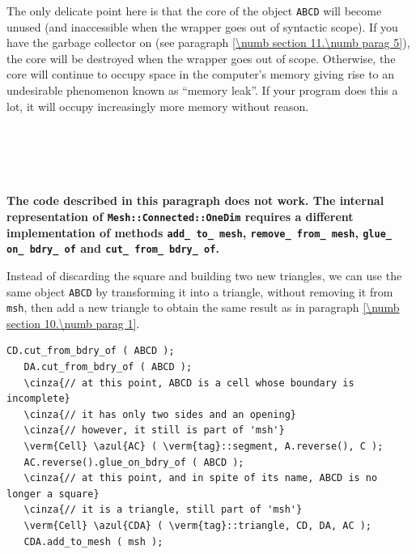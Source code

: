 The only delicate point here is that the core of the {\small\tt{}} object
{\small\tt ABCD}
will become unused (and inaccessible when the wrapper goes out of syntactic scope).
If you have the garbage collector on (see paragraph \ref{\numb section 11.\numb parag 5}),
the core will be destroyed when the wrapper goes out of scope.
Otherwise, the core will continue to occupy space in the computer's memory giving rise
to an undesirable phenomenon known as ``memory leak''.
If your program does this a lot, it will occupy increasingly more memory without reason.


\section{~~}\label{\numb section 10.\numb parag 2}

{\normalfont\bfseries The code described in this paragraph does not work.
The internal representation of {\small\tt Mesh::Connected::OneDim} requires a different
implementation of methods {\small\tt add\_\,to\_\,mesh}, {\small\tt remove\_\,from\_\,mesh},
{\small\tt glue\_\,on\_\,bdry\_\,of} and {\small\tt cut\_\,from\_\,bdry\_\,of}.              }

Instead of discarding the square and building two new triangles, we can use the same
{\small\tt{}} object {\small\tt ABCD}
by transforming it into a triangle, without removing it from {\small\tt msh}, then add
a new triangle to obtain the same result as in paragraph \ref{\numb section 10.\numb parag 1}.

\begin{Verbatim}[commandchars=\\\{\},formatcom=\small\tt,frame=single,
   label=parag-\ref{\numb section 10.\numb parag 2}.cpp,rulecolor=\color{coment},
   baselinestretch=0.94,framesep=2mm]
   CD.cut_from_bdry_of ( ABCD );
   DA.cut_from_bdry_of ( ABCD );
   \cinza{// at this point, ABCD is a cell whose boundary is incomplete}
   \cinza{// it has only two sides and an opening}
   \cinza{// however, it still is part of 'msh'}
   \verm{Cell} \azul{AC} ( \verm{tag}::segment, A.reverse(), C );
   AC.reverse().glue_on_bdry_of ( ABCD );
   \cinza{// at this point, and in spite of its name, ABCD is no longer a square}
   \cinza{// it is a triangle, still part of 'msh'}
   \verm{Cell} \azul{CDA} ( \verm{tag}::triangle, CD, DA, AC );
   CDA.add_to_mesh ( msh );
\end{Verbatim}



